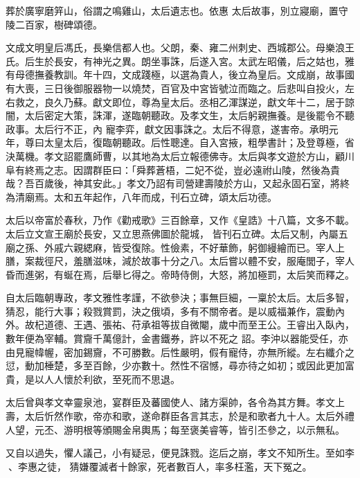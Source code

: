 \begin{pinyinscope}
 葬於廣寧磨笄山，俗謂之鳴雞山，太后遺志也。依惠
 太后故事，別立寢廟，置守陵二百家，樹碑頌德。



 文成文明皇后馮氏，長樂信都人也。父朗，秦、雍二州刺史、西城郡公。母樂浪王氏。后生於長安，有神光之異。朗坐事誅，后遂入宮。太武左昭儀，后之姑也，雅有母德撫養教訓。年十四，文成踐極，以選為貴人，後立為皇后。文成崩，故事國有大喪，三日後御服器物一以燒焚，百官及中宮皆號泣而臨之。后悲叫自投火，左右救之，良久乃蘇。獻文即位，尊為皇太后。丞相乙渾謀逆，獻文年十二，居于諒闇，太后密定大策，誅渾，遂臨朝聽政。及孝文生，太后躬親撫養。是後罷令不聽政事。太后行不正，內
 寵李弈，獻文因事誅之。太后不得意，遂害帝。承明元年，尊曰太皇太后，復臨朝聽政。后性聰達。自入宮掖，粗學書計；及登尊極，省決萬機。孝文詔罷鷹師曹，以其地為太后立報德佛寺。太后與孝文遊於方山，顧川阜有終焉之志。因謂群臣曰：「舜葬蒼梧，二妃不從，豈必遠祔山陵，然後為貴哉？吾百歲後，神其安此。」孝文乃詔有司營建壽陵於方山，又起永固石室，將終為清廟焉。太和五年起作，八年而成，刊石立碑，頌太后功德。



 太后以帝富於春秋，乃作《勸戒歌》三百餘章，又作《皇誥》十八篇，文多不載。太后立文宣王廟於長安，又立思燕佛圖於龍城，
 皆刊石立碑。太后又制，內屬五廟之孫、外戚六親緦麻，皆受復除。性儉素，不好華飾，躬御縵繪而已。宰人上膳，案裁徑尺，羞膳滋味，減於故事十分之八。太后嘗以體不安，服庵閭子，宰人昏而進粥，有蜒在焉，后舉匕得之。帝時侍側，大怒，將加極罰，太后笑而釋之。



 自太后臨朝專政，孝文雅性孝謹，不欲參決；事無巨細，一稟於太后。太后多智，猜忍，能行大事；殺戮賞罰，決之俄頃，多有不關帝者。是以威福兼作，震動內外。故杞道德、王遇、張祐、苻承祖等拔自微閹，歲中而至王公。王睿出入臥內，數年便為宰輔。賞齎千萬億計，金書鐵券，許以不死之
 詔。李沖以器能受任，亦由見寵幃幄，密加錫齎，不可勝數。后性嚴明，假有寵侍，亦無所縱。左右纖介之愆，動加棰楚，多至百餘，少亦數十。然性不宿憾，尋亦待之如初；或因此更加富貴，是以人人懷於利欲，至死而不思退。



 太后曾與孝文幸靈泉池，宴群臣及蕃國使人、諸方渠帥，各令為其方舞。孝文上壽，太后忻然作歌，帝亦和歌，遂命群臣各言其志，於是和歌者九十人。太后外禮人望，元丕、游明根等頒賜金帛輿馬；每至褒美睿等，皆引丕參之，以示無私。



 又自以過失，懼人議己，小有疑忌，便見誅戮。迄后之崩，孝文不知所生。至如李、李惠之徒，
 猜嫌覆滅者十餘家，死者數百人，率多枉濫，天下冤之。




\end{pinyinscope}

